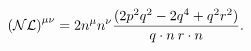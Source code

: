 \begin{equation}
\label{NL}
{\cal (NL)}^{\mu\nu}=2n^\mu n^\nu \frac{(2p^2 q^2-2q^4+q^2 r^2)}{q\cdot n\:r\cdot n}.
\end{equation}

